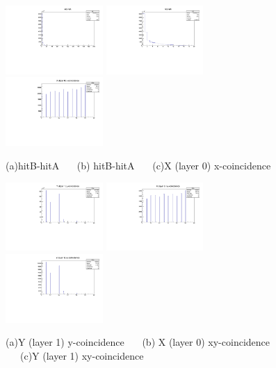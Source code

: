 \documentclass[a4paper,11pt]{article}
\theoremstyle{mytheor}
\begin{document}
\begin{figure}[H] 
\vspace*{-0.3cm} 
\includegraphics[width=0.33\textwidth,scale=0.5,trim=0 0 0 0,clip]{plotsdir/file0_test-dt-1.pdf} 
\includegraphics[width=0.33\textwidth,scale=0.5,trim=0 0 0 0,clip]{plotsdir/file0_test-dt2-1.pdf} 
\includegraphics[width=0.33\textwidth,scale=0.5,trim=0 0 0 0,clip]{plotsdir/file0_test-X0a-1.pdf} 
\caption{(a)hitB-hitA ~~~(b) hitB-hitA ~~~(c)X (layer 0) x-coincidence } 
\end{figure} 
\begin{figure}[H] 
\vspace*{-0.3cm} 
\includegraphics[width=0.33\textwidth,scale=0.5,trim=0 0 0 0,clip]{plotsdir/file0_test-Y1a-1.pdf} 
\includegraphics[width=0.33\textwidth,scale=0.5,trim=0 0 0 0,clip]{plotsdir/file0_test-X0b-1.pdf} 
\includegraphics[width=0.33\textwidth,scale=0.5,trim=0 0 0 0,clip]{plotsdir/file0_test-Y1b-1.pdf} 
\caption{(a)Y (layer 1) y-coincidence ~~~(b) X (layer 0) xy-coincidence ~~~(c)Y (layer 1) xy-coincidence } 
\end{figure} 
\end{document}
